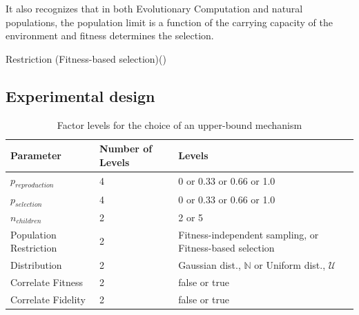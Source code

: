 It also recognizes that in both Evolutionary Computation and natural populations, the population limit is a function of the carrying capacity of the environment and fitness determines the selection.

\begin{function}
	\caption{Restriction (Fitness-based selection)()}
\end{function}

\subsection{Experimental design}



\begin{table} %
	\begin{center}
		\caption{Factor levels for the choice of an upper-bound mechanism}
		\label{tbl:factor-levels-for-the-choice-of-an-upper-bound-mechanism}
		\begin{tabular}{@{}llp{6cm}@{}}
			\toprule
			Parameter              & Number of Levels & Levels                                                       \\
			\midrule
			$p_{reproduction}$     & 4                & 0 or 0.33 or 0.66 or 1.0                                     \\
			$p_{selection}$        & 4                & 0 or 0.33 or 0.66 or 1.0                                     \\
			$n_{children}$         & 2                & 2 or 5                                                       \\
			Population Restriction & 2                & Fitness-independent sampling, or Fitness-based selection     \\
			Distribution           & 2                & Gaussian dist., $\mathbb{N}$ or Uniform dist., $\mathcal{U}$ \\
			Correlate Fitness      & 2                & false or true                                                \\
			Correlate Fidelity     & 2                & false or true                                                \\
			\bottomrule
		\end{tabular}
	\end{center}
\end{table}



